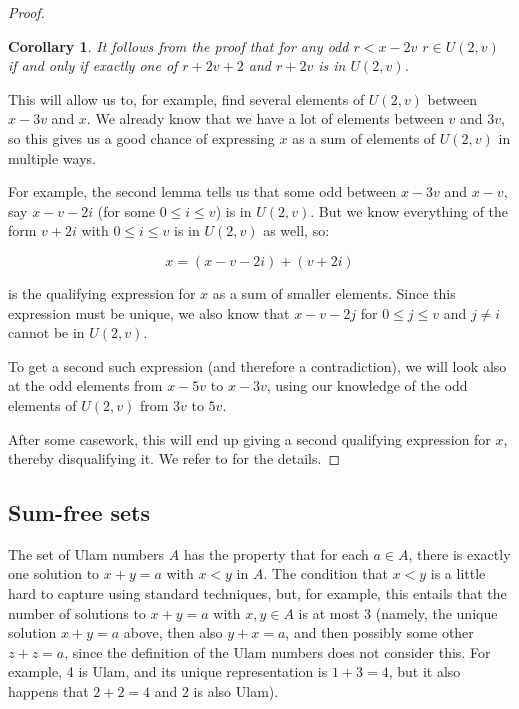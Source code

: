 \documentclass{article}
\newtheorem{corollary}{Corollary}[theorem]
\theoremstyle{definition}
\theoremstyle{remark}
\numberwithin{equation}{section}
\begin{document}
\begin{proof}
  \begin{corollary}
    It follows from the proof that for any odd $r < x-2v$
    $r \in U(2,v)$ if and only if exactly one of $r+2v+2$ and $r+2v$
    is in $U(2,v)$.
  \end{corollary}

  This will allow us to, for example, find several elements of
  $U(2,v)$ between $x-3v$ and $x$.  We already know that we have a lot
  of elements between $v$ and $3v$, so this gives us a good chance of
  expressing $x$ as a sum of elements of $U(2,v)$ in multiple ways.  

  For example, the second lemma tells us that some odd between $x-3v$
  and $x-v$, say $x-v-2i$ (for some $0 \leq i \leq v$) is in
  $U(2,v)$.  But we know everything of the form $v+2i$ with $0 \leq i
  \leq v$ is in $U(2,v)$ as well, so: 

  \[x = (x-v-2i)+(v+2i)\]

  is the qualifying expression for $x$ as a sum of smaller elements.
  Since this expression must be unique, we also know that $x-v-2j$ for
  $0 \leq j \leq v$ and $j \neq i$ cannot be in $U(2,v)$.  

  To get a second such expression (and therefore a contradiction), we
  will look also at the odd elements from $x-5v$ to $x-3v$, using our
  knowledge of the odd elements of $U(2,v)$ from $3v$ to $5v$.  

  After some casework, this will end up giving a second qualifying
  expression for $x$, thereby disqualifying it.  We refer to
  \cite{schmerl:jct1994} for the details.
  

  \end{proof}

\subsection{Sum-free sets}

The set of Ulam numbers $A$ has the property that for each $a \in A$,
there is exactly one solution to $x+y=a$ with $x < y$ in $A$.  The
condition that $x < y$ is a little hard to capture using standard
techniques, but, for example, this entails that the number of
solutions to $x + y = a$ with $x, y \in A$ is at most 3 (namely, the
unique solution $x+y = a$ above, then also $y+x = a$, and then
possibly some other $z+z = a$, since the definition of the Ulam
numbers does not consider this.  For example, 4 is Ulam, and its
unique representation is $1+3=4$, but it also happens that $2+2=4$ and
2 is also Ulam).
\end{document}
